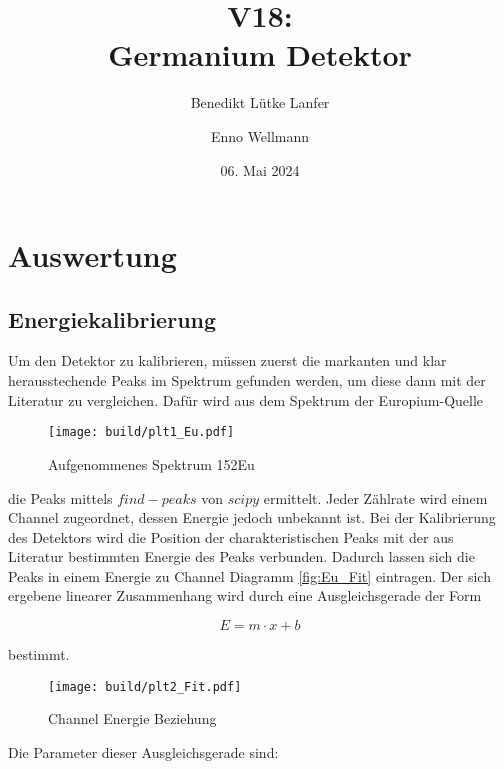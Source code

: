

\title{V18:\\ Germanium Detektor}
\author{Benedikt Lütke Lanfer \and Enno Wellmann}
\date{06. Mai 2024}
\publishers{TU Dortmund – Fakultät Physik}



\tableofcontents
\newpage



\newpage
\section{Auswertung}
\subsection{Energiekalibrierung}
Um den Detektor zu kalibrieren, müssen zuerst die markanten und klar herausstechende Peaks im Spektrum gefunden
werden, um diese dann mit der Literatur zu vergleichen. Dafür wird aus dem
Spektrum der Europium-Quelle

\begin{figure}[H]
	\centering
	\texttt{[image: build/plt1\_Eu.pdf]}
	\caption{Aufgenommenes Spektrum 152Eu}\label{fig:Eu_spektrum}
	\FloatBarrier
\end{figure}

die Peaks mittels $find-peaks$ von $scipy$ \cite{scipy} ermittelt. Jeder
Zählrate wird einem Channel zugeordnet, dessen Energie jedoch unbekannt ist.
Bei der Kalibrierung des Detektors wird die Position der charakteristischen
Peaks mit der aus Literatur \cite{web:Eu} bestimmten Energie des Peaks
verbunden. Dadurch lassen sich die Peaks in einem Energie zu Channel Diagramm
\eqref{fig:Eu_Fit} eintragen. Der sich ergebene linearer Zusammenhang wird
durch eine Ausgleichsgerade der Form

\begin{equation}
	E=m \cdot x +b
\end{equation}

bestimmt.

\begin{figure}[H]
	\centering
	\texttt{[image: build/plt2\_Fit.pdf]}
	\caption{Channel Energie Beziehung}\label{fig:Eu_Fit}
\end{figure}

Die Parameter dieser Ausgleichsgerade sind:

